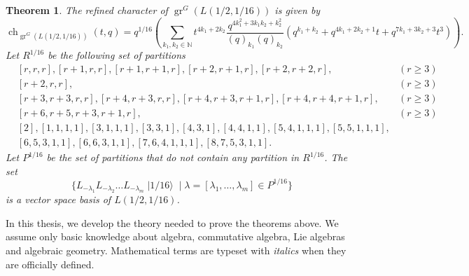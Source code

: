 \documentclass[a4paper, 12pt, reqno]{amsart}
\newtheorem{theorem}{Theorem}[section]
\theoremstyle{remark}
\DeclareMathOperator{\gr}{gr}
\DeclareMathOperator{\ch}{ch}
\DeclareMathOperator{\vacsixteen}{|1/16\rangle}
\begin{document}
\begin{theorem}
  \label{thr:5}
  The refined character of $\gr^G(L(1/2, 1/16))$ is given by
  \begin{equation*}
    \ch_{\gr^G(L(1/2, 1/16))}(t, q) = q^{1/16}\left(\sum_{k_1, k_2 \in \mathbb{N}}t^{4k_1 + 2k_2}\frac{q^{4k_1^2 + 3k_1k_2 + k_2^2}}{(q)_{k_1}(q)_{k_2}}(q^{k_1 + k_2} + q^{4k_1 + 2k_2 + 1}t + q^{7k_1 + 3k_2 + 3}t^3)\right).
  \end{equation*}
  Let $R^{1/16}$ be the following set of partitions
  \begin{align*}
    &[r, r, r], [r + 1, r, r], [r + 1, r + 1, r], [r + 2, r + 1, r], [r + 2, r + 2, r], &(r \ge 3) \\
    &[r + 2, r, r], &(r \ge 3) \\
    &[r + 3, r + 3, r, r], [r + 4, r + 3, r, r],  [r + 4, r + 3, r + 1, r], [r + 4, r + 4, r + 1, r], &(r \ge 3)\\
    &[r + 6, r + 5, r + 3, r + 1, r], &(r \ge 3) \\
    &[2], [1, 1, 1, 1], [3, 1, 1, 1], [3, 3, 1], [4, 3, 1], [4, 4, 1, 1], [5, 4, 1, 1, 1], [5, 5, 1, 1, 1], \\
    &[6, 5, 3, 1, 1], [6, 6, 3, 1, 1], [7, 6, 4, 1, 1, 1], [8, 7, 5, 3, 1, 1].
  \end{align*}
  Let $P^{1/16}$ be the set of partitions that do not contain any partition in $R^{1/16}$.
  The set
  \begin{equation*}
    \{L_{-\lambda_1}L_{-\lambda_2}\dots L_{-\lambda_m}\vacsixteen \mid \lambda = [\lambda_1, \dots, \lambda_m] \in P^{1/16}\}
  \end{equation*}
  is a vector space basis of $L(1/2, 1/16)$.
\end{theorem}

In this thesis, we develop the theory needed to prove the theorems above.
We assume only basic knowledge about algebra, commutative algebra, Lie algebras and algebraic geometry.
Mathematical terms are typeset with \emph{italics} when they are officially defined.
\end{document}

